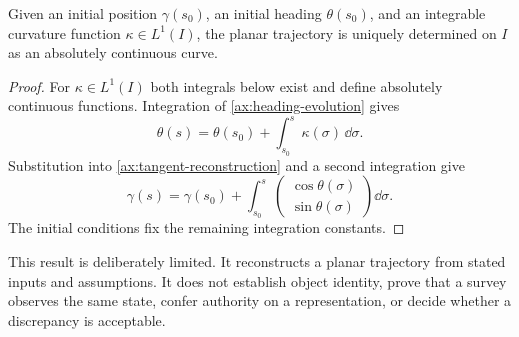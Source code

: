 \begin{proposition}
\label{prop:curvature-driven-reconstruction}
Given an initial position \(\gamma(s_0)\), an initial heading
\(\theta(s_0)\), and an integrable curvature function
\(\kappa\in L^1(I)\), the planar trajectory is uniquely determined on
\(I\) as an absolutely continuous curve.
\end{proposition}

\begin{proof}
For \(\kappa\in L^1(I)\) both integrals below exist and define absolutely
continuous functions. Integration of \cref{ax:heading-evolution} gives
\[
\theta(s)=\theta(s_0)+\int_{s_0}^{s}\kappa(\sigma)\,\dd\sigma.
\]
Substitution into \cref{ax:tangent-reconstruction} and a second
integration give
\[
\gamma(s)=\gamma(s_0)+
\int_{s_0}^{s}
\begin{pmatrix}
\cos\theta(\sigma)\\
\sin\theta(\sigma)
\end{pmatrix}
\dd\sigma.
\]
The initial conditions fix the remaining integration constants.
\end{proof}

This result is deliberately limited. It reconstructs a planar trajectory
from stated inputs and assumptions. It does not establish object
identity, prove that a survey observes the same state, confer authority
on a representation, or decide whether a discrepancy is acceptable.
